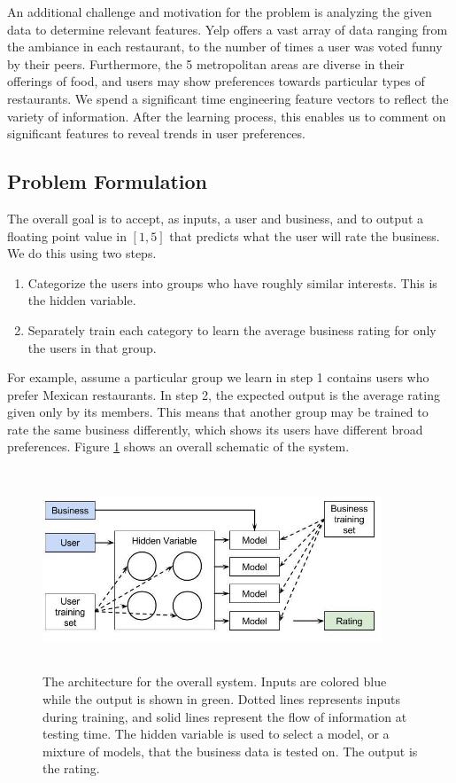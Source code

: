 \documentclass[11pt]{article}
\begin{document}
An additional challenge and motivation for the problem is analyzing the given data to determine relevant features. Yelp offers a vast array of data ranging from the ambiance in each restaurant, to the number of times a user was voted funny by their peers. Furthermore, the 5 metropolitan areas are diverse in their offerings of food, and users may show preferences towards particular types of restaurants. We spend a significant time engineering feature vectors to reflect the variety of information. After the learning process, this enables us to comment on significant features to reveal trends in user preferences. 

\subsection{Problem Formulation}
The overall goal is to accept, as inputs, a user and business, and to output a floating point value in $[1, 5]$ that predicts what the user will rate the business. We do this using two steps.

\begin{enumerate}
\item Categorize the users into groups who have roughly similar interests. This is the hidden variable.
\item Separately train each category to learn the average business rating for only the users in that group.
\end{enumerate}

For example, assume a particular group we learn in step 1 contains users who prefer Mexican restaurants. In step 2, the expected output is the average rating given only by its members. This means that another group may be trained to rate the same business differently, which shows its users have different broad preferences. Figure \ref{fig:system} shows an overall schematic of the system.\\

\begin{figure}[h!]
    \centering
    \includegraphics[width=0.9\textwidth, height=6cm]{system}
    \caption{The architecture for the overall system. Inputs are colored blue while the output is shown in green. Dotted lines represents inputs during training, and solid lines represent the flow of information at testing time. The hidden variable is used to select a model, or a mixture of models, that the business data is tested on. The output is the rating.}
    \label{fig:system}
\end{figure} 
\end{document}

